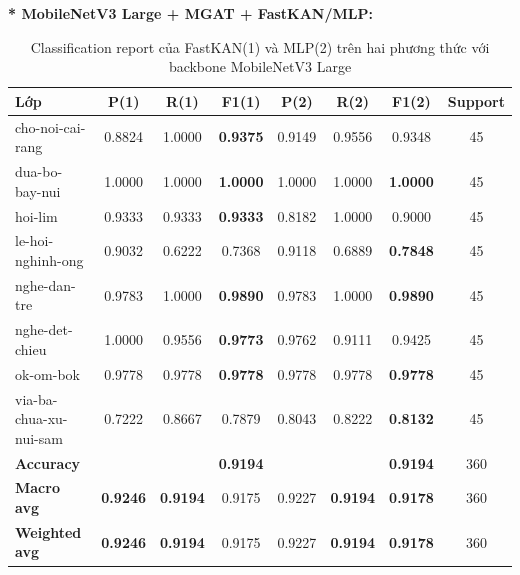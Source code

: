 \textbf{* MobileNetV3 Large + MGAT + FastKAN/MLP:}
\begin{table}[H]
\centering
\renewcommand{\arraystretch}{1.08}
\caption{\centering Classification report của FastKAN(1) và MLP(2) trên hai phương thức với backbone MobileNetV3 Large}
\begin{tabular}{lccccccc}
\hline \textbf{Lớp} & \textbf{P(1)} & \textbf{R(1)} & \textbf{F1(1)} & \textbf{P(2)} & \textbf{R(2)} & \textbf{F1(2)} & \textbf{Support} \\ \hline

cho-noi-cai-rang 
& 0.8824 & 1.0000 & \textbf{0.9375} 
& 0.9149 & 0.9556 & 0.9348 & 45 \\

dua-bo-bay-nui
& 1.0000 & 1.0000 & \textbf{1.0000}
& 1.0000 & 1.0000 & \textbf{1.0000} & 45 \\

hoi-lim 
& 0.9333 & 0.9333 & \textbf{0.9333} 
& 0.8182 & 1.0000 & 0.9000 & 45 \\

le-hoi-nghinh-ong
& 0.9032 & 0.6222 & 0.7368 
& 0.9118 & 0.6889 & \textbf{0.7848} & 45 \\

nghe-dan-tre 
& 0.9783 & 1.0000 & \textbf{0.9890} 
& 0.9783 & 1.0000 & \textbf{0.9890} & 45 \\

nghe-det-chieu 
& 1.0000 & 0.9556 & \textbf{0.9773} 
& 0.9762 & 0.9111 & 0.9425 & 45 \\

ok-om-bok 
& 0.9778 & 0.9778 & \textbf{0.9778} 
& 0.9778 & 0.9778 & \textbf{0.9778} & 45 \\

via-ba-chua-xu-nui-sam
& 0.7222 & 0.8667 & 0.7879 
& 0.8043 & 0.8222 & \textbf{0.8132} & 45 \\
\hline

\textbf{Accuracy}
& & & \textbf{0.9194}
& & & \textbf{0.9194} & 360 \\

\textbf{Macro avg} 
& \textbf{0.9246} & \textbf{0.9194} & 0.9175 
& 0.9227 & \textbf{0.9194} & \textbf{0.9178} & 360 \\

\textbf{Weighted avg} 
& \textbf{0.9246} & \textbf{0.9194} & 0.9175 
& 0.9227 & \textbf{0.9194} & \textbf{0.9178} & 360 \\
\hline
\end{tabular}
\end{table}
